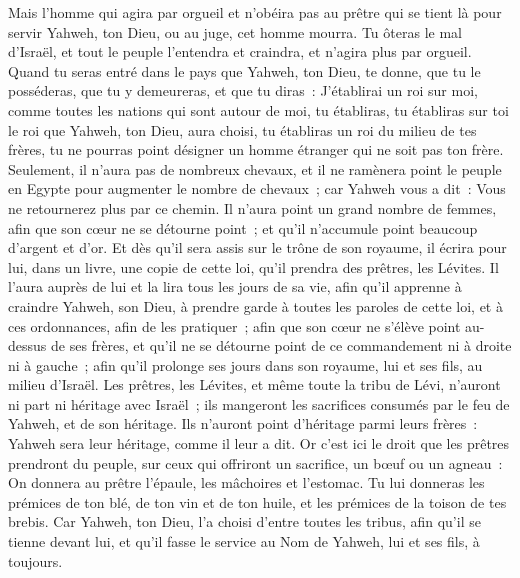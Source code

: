 \begin{multicols}{2}
Mais l'homme qui agira par orgueil et n'obéira pas au prêtre qui se tient là pour servir Yahweh, ton Dieu, ou au juge, cet homme mourra. Tu ôteras le mal d'Israël,
et tout le peuple l'entendra et craindra, et n'agira plus par orgueil.
Quand tu seras entré dans le pays que Yahweh, ton Dieu, te donne, que tu le posséderas, que tu y demeureras, et que tu diras~: J'établirai un roi sur moi, comme toutes les nations qui sont autour de moi,
tu établiras, tu établiras sur toi le roi que Yahweh, ton Dieu, aura choisi, tu établiras un roi du milieu de tes frères, tu ne pourras point désigner un homme étranger qui ne soit pas ton frère.
Seulement, il n'aura pas de nombreux chevaux, et il ne ramènera point le peuple en Egypte pour augmenter le nombre de chevaux~; car Yahweh vous a dit~: Vous ne retournerez plus par ce chemin.
Il n'aura point un grand nombre de femmes, afin que son cœur ne se détourne point~; et qu'il n'accumule point beaucoup d'argent et d'or.
Et dès qu'il sera assis sur le trône de son royaume, il écrira pour lui, dans un livre, une copie de cette loi, qu'il prendra des prêtres, les Lévites.
Il l'aura auprès de lui et la lira tous les jours de sa vie, afin qu'il apprenne à craindre Yahweh, son Dieu, à prendre garde à toutes les paroles de cette loi, et à ces ordonnances, afin de les pratiquer~;
afin que son cœur ne s'élève point au-dessus de ses frères, et qu'il ne se détourne point de ce commandement ni à droite ni à gauche~; afin qu'il prolonge ses jours dans son royaume, lui et ses fils, au milieu d'Israël.
\VerseOne{}Les prêtres, les Lévites, et même toute la tribu de Lévi, n'auront ni part ni héritage avec Israël~; ils mangeront les sacrifices consumés par le feu de Yahweh, et de son héritage.
Ils n'auront point d'héritage parmi leurs frères~: Yahweh sera leur héritage, comme il leur a dit.
Or c'est ici le droit que les prêtres prendront du peuple, sur ceux qui offriront un sacrifice, un bœuf ou un agneau~: On donnera au prêtre l'épaule, les mâchoires et l'estomac.
Tu lui donneras les prémices de ton blé, de ton vin et de ton huile, et les prémices de la toison de tes brebis.
Car Yahweh, ton Dieu, l'a choisi d'entre toutes les tribus, afin qu'il se tienne devant lui, et qu'il fasse le service au Nom de Yahweh, lui et ses fils, à toujours.

\end{multicols}
